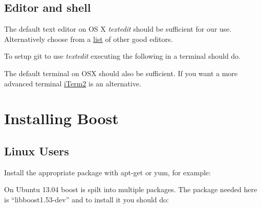 \subsection{Editor and shell}\label{editor-and-shell-1}

The default text editor on OS X \emph{textedit} should be sufficient for
our use. Alternatively choose from a
\href{http://mac.appstorm.net/roundups/office-roundups/top-10-mac-text-editors/}{list}
of other good editors.

To setup git to use \emph{textedit} executing the following in a
terminal should do.

\begin{Shaded}
\begin{Highlighting}[]
 
\end{Highlighting}
\end{Shaded}

The default terminal on OSX should also be sufficient. If you want a
more advanced terminal \href{http://www.iterm2.com/}{iTerm2} is an
alternative.

\section{Installing Boost}\label{installing-boost}

\subsection{Linux Users}\label{linux-users}

Install the appropriate package with apt-get or yum, for example:

\begin{Shaded}
\begin{Highlighting}[]
 
\end{Highlighting}
\end{Shaded}

On Ubuntu 13.04 boost is spilt into multiple packages. The package
needed here is ``libboost1.53-dev'' and to install it you should do:

\begin{Shaded}
\begin{Highlighting}[]
 
\end{Highlighting}
\end{Shaded}

